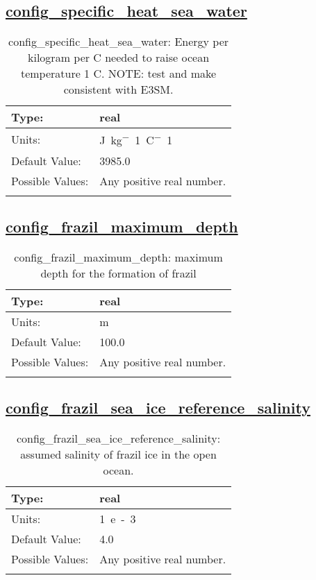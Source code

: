 \subsection[config\_specific\_heat\_sea\_water]{\hyperref[sec:nm_tab_frazil_ice]{config\_specific\_heat\_sea\_water}}
\label{subsec:nm_sec_config_specific_heat_sea_water}
\begin{center}
\begin{longtable}{| p{2.0in} || p{4.0in} |}
    \hline
    Type: & real \\
    \hline
    Units: & \si{J.kg^-1.C^-1} \\
    \hline
    Default Value: & 3985.0 \\
    \hline
    Possible Values: & Any positive real number. \\
    \hline
    \caption{config\_specific\_heat\_sea\_water: Energy per kilogram per C needed to raise ocean temperature 1 C. NOTE: test and make consistent with E3SM.}
\end{longtable}
\end{center}
\subsection[config\_frazil\_maximum\_depth]{\hyperref[sec:nm_tab_frazil_ice]{config\_frazil\_maximum\_depth}}
\label{subsec:nm_sec_config_frazil_maximum_depth}
\begin{center}
\begin{longtable}{| p{2.0in} || p{4.0in} |}
    \hline
    Type: & real \\
    \hline
    Units: & \si{m} \\
    \hline
    Default Value: & 100.0 \\
    \hline
    Possible Values: & Any positive real number. \\
    \hline
    \caption{config\_frazil\_maximum\_depth: maximum depth for the formation of frazil}
\end{longtable}
\end{center}
\subsection[config\_frazil\_sea\_ice\_reference\_salinity]{\hyperref[sec:nm_tab_frazil_ice]{config\_frazil\_sea\_ice\_reference\_salinity}}
\label{subsec:nm_sec_config_frazil_sea_ice_reference_salinity}
\begin{center}
\begin{longtable}{| p{2.0in} || p{4.0in} |}
    \hline
    Type: & real \\
    \hline
    Units: & \si{1.e-3} \\
    \hline
    Default Value: & 4.0 \\
    \hline
    Possible Values: & Any positive real number. \\
    \hline
    \caption{config\_frazil\_sea\_ice\_reference\_salinity: assumed salinity of frazil ice in the open ocean.}
\end{longtable}
\end{center}
